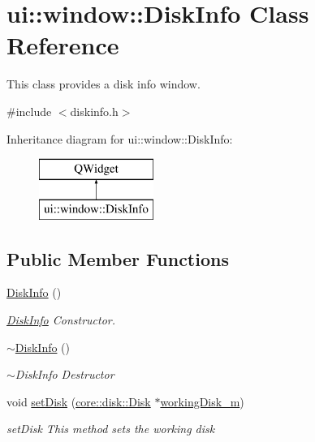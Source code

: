 \hypertarget{classui_1_1window_1_1_disk_info}{}\section{ui\+:\+:window\+:\+:Disk\+Info Class Reference}
\label{classui_1_1window_1_1_disk_info}


This class provides a disk info window.  




{\ttfamily \#include $<$diskinfo.\+h$>$}

Inheritance diagram for ui\+:\+:window\+:\+:Disk\+Info\+:\begin{figure}[H]
\begin{center}
\leavevmode
\includegraphics[height=2.000000cm]{classui_1_1window_1_1_disk_info}
\end{center}
\end{figure}
\subsection*{Public Member Functions}
\begin{DoxyCompactItemize}
\item 
\mbox{\hyperlink{classui_1_1window_1_1_disk_info_aca4cde2e854e44f42f3edb8c9bba47ea}{Disk\+Info}} ()
\begin{DoxyCompactList}\small\item\em \mbox{\hyperlink{classui_1_1window_1_1_disk_info}{Disk\+Info}} Constructor. \end{DoxyCompactList}\item 
\mbox{\hyperlink{classui_1_1window_1_1_disk_info_a8a4c3385e2661ba6dc614d00f8dec9d9}{$\sim$\+Disk\+Info}} ()
\begin{DoxyCompactList}\small\item\em $\sim$\+Disk\+Info Destructor \end{DoxyCompactList}\item 
void \mbox{\hyperlink{classui_1_1window_1_1_disk_info_ad818d3e209f7458d33d79a354958035b}{set\+Disk}} (\mbox{\hyperlink{classcore_1_1disk_1_1_disk}{core\+::disk\+::\+Disk}} $\ast$\mbox{\hyperlink{classui_1_1window_1_1_disk_info_a61fcd8caba70cb0c493618e7263a0015}{working\+Disk\+\_\+m}})
\begin{DoxyCompactList}\small\item\em set\+Disk This method sets the working disk \end{DoxyCompactList}\end{DoxyCompactItemize}
